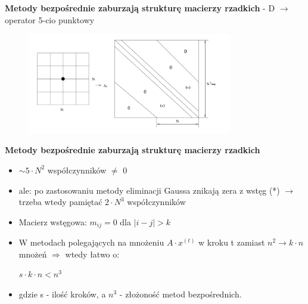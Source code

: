 \begin{frame}{}
  \textbf{Metody bezpośrednie zaburzają strukturę macierzy rzadkich}
   - D $\rightarrow$ operator 5-cio punktowy
  \begin{figure}
    \centering
    \includegraphics[height=0.5\textheight, width=0.8\textwidth]{img/12/iteracja1}
  \end{figure}
\end{frame}

\begin{frame}{}
  \begin{block}{\textbf{Metody bezpośrednie zaburzają strukturę macierzy rzadkich}}
    \begin{itemize}
      \item{$\sim 5\cdot N^2$ współczynników $\neq$ 0}
      \item{ale: po zastosowaniu metody eliminacji Gaussa znikają zera z wstęg
      \newline (*) $\rightarrow$ trzeba wtedy pamiętać $2\cdot N^3$ współczynników}
      \item{Macierz wstęgowa: $m_{ij}=0$ dla $|i-j|>k$}
      \item W metodach polegających na mnożeniu $A\cdot x^{(t)}$ w kroku t zamiast $n^2 \rightarrow k\cdot n$ mnożeń $\Rightarrow$ wtedy łatwo o:
      \begin{center}
      $s\cdot k\cdot n<n^3$
      \end{center}
      \item gdzie s - ilość kroków, a $n^3$ - złożoność metod bezpośrednich.
    \end{itemize}
  \end{block}
\end{frame}
